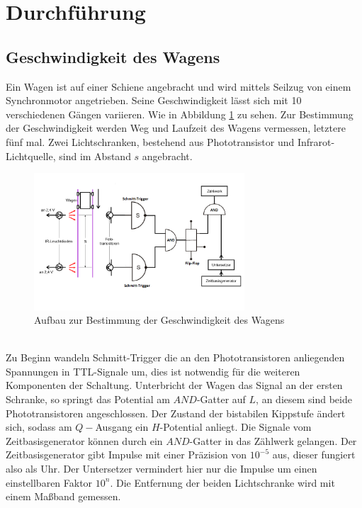 
\section{Durchführung}
\label{sec:Durchführung}
\subsection{Geschwindigkeit des Wagens}
Ein Wagen ist auf einer Schiene angebracht und wird mittels Seilzug von einem
Synchronmotor angetrieben. Seine Geschwindigkeit lässt sich mit 10 verschiedenen
Gängen variieren. Wie in Abbildung \ref{fig:geschw} zu sehen.
Zur Bestimmung der Geschwindigkeit werden Weg und Laufzeit des Wagens vermessen, letztere fünf mal.
Zwei Lichtschranken, bestehend aus Phototransistor und Infrarot-Lichtquelle,
sind im Abstand $s$ angebracht.
\begin{figure}
 \centering
 \includegraphics[width=0.7\textwidth]{Aufbau1.png}
 \caption{Aufbau zur Bestimmung der Geschwindigkeit des Wagens}
 \label{fig:geschw}
 \end{figure}\\
Zu Beginn wandeln Schmitt-Trigger die an den Phototransistoren anliegenden
Spannungen in TTL-Signale um, dies ist notwendig für die weiteren Komponenten
der Schaltung. Unterbricht der Wagen das Signal an der ersten Schranke, so
springt das Potential am $AND$-Gatter auf $L$, an diesem sind beide
Phototransistoren angeschlossen. Der Zustand der bistabilen
Kippstufe ändert sich, sodass am $Q-$Ausgang ein $H$-Potential anliegt.
Die Signale vom Zeitbasisgenerator können durch ein $AND$-Gatter
in das Zählwerk gelangen. Der Zeitbasisgenerator gibt Impulse mit einer Präzision
von $10^{-5}$ aus, dieser fungiert also als Uhr. Der  Untersetzer vermindert hier
nur die Impulse um einen einstellbaren Faktor $10^n$.
Die Entfernung der beiden Lichtschranke wird mit einem Maßband gemessen.
\newpage
